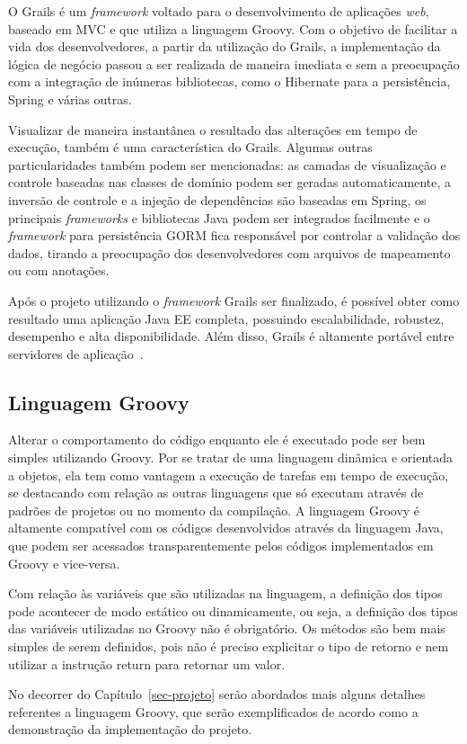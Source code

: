 O Grails é um \textit{framework} voltado para o desenvolvimento de aplicações \textit{web}, baseado em MVC e que utiliza a linguagem Groovy. Com o objetivo de facilitar a vida dos desenvolvedores, a partir da utilização do Grails, a implementação da lógica de negócio passou a ser realizada de maneira imediata e sem a preocupação com a integração de inúmeras bibliotecas, como o Hibernate para a persistência, Spring e várias outras.

Visualizar de maneira instantânea o resultado das alterações em tempo de execução, também é uma característica do Grails. Algumas outras particularidades também podem ser mencionadas: as camadas de visualização e controle baseadas nas classes de domínio podem ser geradas automaticamente, a inversão de controle e a injeção de dependências são baseadas em Spring, os principais \textit{frameworks} e bibliotecas Java podem ser integrados facilmente e o \textit{framework} para persistência GORM fica responsável por controlar a validação dos dados, tirando a preocupação dos desenvolvedores com arquivos de mapeamento ou com anotações.

Após o projeto utilizando o \textit{framework} Grails ser finalizado, é possível obter como resultado uma aplicação Java EE completa, possuindo escalabilidade, robustez, desempenho e alta disponibilidade. Além disso, Grails é altamente portável entre servidores de aplicação~\cite{weissmann:fgapdw15}.       


\subsection{Linguagem Groovy}
\label{sec-ref-linguagem-groovy}


Alterar o comportamento do código enquanto ele é executado pode ser bem simples utilizando Groovy. Por se tratar de uma linguagem dinâmica e orientada a objetos, ela tem como vantagem a execução de tarefas em tempo de execução, se destacando com relação as outras linguagens que só executam através de padrões de projetos ou no momento da compilação. A linguagem Groovy é altamente compatível com os códigos desenvolvidos através da linguagem Java, que podem ser acessados transparentemente pelos códigos implementados em Groovy e vice-versa.

Com relação às variáveis que são utilizadas na linguagem, a definição dos tipos pode acontecer de modo estático ou dinamicamente, ou seja, a definição dos tipos das variáveis utilizadas no Groovy não é obrigatório. Os métodos são bem mais simples de serem definidos, pois não é preciso explicitar o tipo de retorno e nem utilizar a instrução return para retornar um valor.

No decorrer do Capítulo~\ref{sec-projeto} serão abordados mais alguns detalhes referentes a linguagem Groovy, que serão exemplificados de acordo como a demonstração da implementação do projeto.         



       